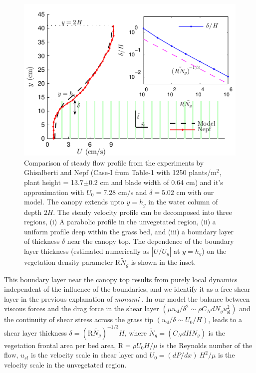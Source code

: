 \documentclass[aps,prl,twocolumn,superscriptaddress,10pt]{revtex4-1}  %
\newcommand{\hg}{h_g}
\newcommand{\Rey}{\text{R}}
\newcommand{\Ndg}{\tilde{N}_g}
\newcommand{\monami}{\textit{monami }}
\begin{document}
\begin{figure}
\includegraphics[scale=1]{Grass_Base_Nepf_shear}
\caption{Comparison of steady flow profile from the experiments by Ghisalberti and Nepf\cite{Nepf04} (Case-I from Table-1 with 1250 plants/m$^2$, 
plant height = 13.7$\pm 0.2$ cm and blade width of 0.64 cm)
 and it's approximation with $U_0=7.28$ cm/s and $\delta = 5.02$ cm with our model. The canopy extends upto $y=h_g$ in the water column of depth $2H$. 
The steady velocity profile can be decomposed into three regions, (i) A parabolic profile in the unvegetated region, (ii) a uniform profile deep within the grass bed, and (iii) a boundary layer of thickness $\delta$ near the canopy top. 
The dependence of the boundary layer thickness (estimated numerically as $|U/U_y|$ at $y=\hg$) on the vegetation density parameter $\Rey \Ndg$ is shown in the inset.}
\label{basicflow}
\end{figure}
This boundary layer near the canopy top results from purely local dynamics independent of the influence of the boundaries, and we identify it as a free shear layer\cite{Ghisal02} in the previous explanation of \monami. 
In our model the balance between viscous forces and the drag force in the shear layer $(\mu u_\text{sl}/\delta^2 \sim \rho C_N d N_g u_\text{sl}^2)$ and the continuity of shear stress across the grass tip $(u_\text{sl}/\delta \sim U_0/H)$, leads to a shear layer thickness $\delta=(\Rey\tilde{N_g})^{-1/3}H$, where $\Ndg = \left(C_N d H N_g\right)$ is the vegetation frontal area per bed area, $\Rey=\rho U_0 H/\mu$ is the Reynolds number of the flow, $u_{sl}$ is the velocity scale in shear layer and $U_0 = {(dP/dx)~H^2}/{\mu}$ is the velocity scale in the unvegetated region. 
\end{document}
